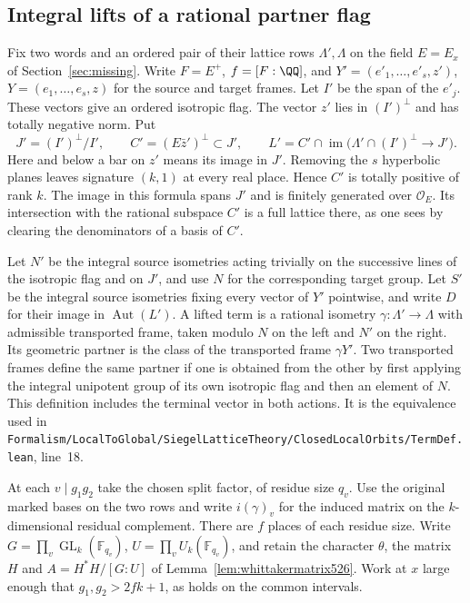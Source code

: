 \documentclass[a4paper,11pt]{article}
\theoremstyle{definition}
\theoremstyle{remark}
\newcommand{\srcloc}[2]{{\small\nolinkurl{#1.lean}}, line~#2}
\numberwithin{equation}{section}
\begin{document}
\subsection{Integral lifts of a rational partner flag}
\label{sec:partnerlifts531}

Fix two words and an ordered pair of their lattice rows
\(\Lambda',\Lambda\) on the field \(E=E_x\) of
Section~\ref{sec:missing}. Write \(F=E^+\), \(f=[F:\QQ]\), and
\(Y'=(e'_1,\ldots,e'_s,z')\), \(Y=(e_1,\ldots,e_s,z)\)
for the source and target frames. Let \(I'\) be the span of the
\(e'_j\). These vectors give an ordered isotropic flag. The vector
\(z'\) lies in \((I')^\perp\) and has totally negative norm.
Put
\[
 J'=(I')^\perp/I',\qquad C'=(E\bar z')^\perp\subset J',\qquad
 L'=C'\cap\operatorname{im}\big(\Lambda'\cap(I')^\perp\longrightarrow J'\big).
\]
Here and below a bar on \(z'\) means its image in \(J'\).
Removing the \(s\) hyperbolic planes leaves signature \((k,1)\)
at every real place. Hence \(C'\) is totally positive of rank \(k\).
The image in this formula spans \(J'\) and is finitely generated
over \(\mathcal O_E\). Its intersection with the rational subspace
\(C'\) is a full lattice there, as one sees by clearing the
denominators of a basis of \(C'\).

Let \(N'\) be the integral source isometries acting trivially on
the successive lines of the isotropic flag and on \(J'\), and use
\(N\) for the corresponding target group. Let \(S'\) be the integral
source isometries fixing every vector of \(Y'\) pointwise, and write
\(D\) for their image in \(\operatorname{Aut}(L')\). A lifted term
is a rational isometry \(\gamma:\Lambda'\longrightarrow\Lambda\)
with admissible transported frame, taken modulo \(N\) on the left
and \(N'\) on the right. Its geometric partner is the class of the
transported frame \(\gamma Y'\). Two transported frames define the
same partner if one is obtained from the other by first applying
the integral unipotent group of its own isotropic flag and then
an element of \(N\). This definition includes the terminal vector
in both actions. It is the equivalence used in
\srcloc{Formalism/LocalToGlobal/SiegelLatticeTheory/ClosedLocalOrbits/TermDef}{18}.

At each \(v\mid g_1g_2\) take the chosen split factor, of residue
size \(q_v\). Use the original marked bases on the two rows and
write \(i(\gamma)_v\) for the induced matrix on the \(k\)-dimensional
residual complement. There are \(f\) places of each residue size.
Write \(G=\prod_v\operatorname{GL}_k(\mathbb F_{q_v})\),
\(U=\prod_v U_k(\mathbb F_{q_v})\), and retain the character
\(\theta\), the matrix \(H\) and \(A=H^*H/[G:U]\) of
Lemma~\ref{lem:whittakermatrix526}. Work at \(x\) large enough
that \(g_1,g_2>2fk+1\), as holds on the common intervals.
\end{document}
